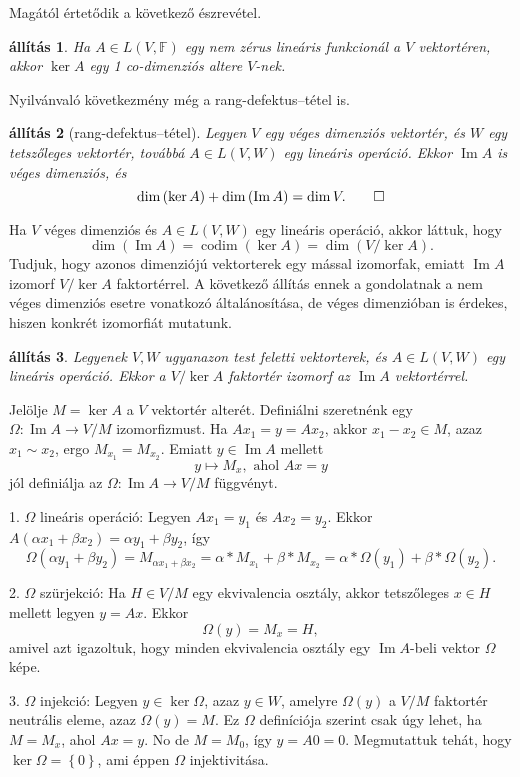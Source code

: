 \documentclass[9pt, a4paper, showtrims]{memoir}
\makeatletter
\renewenvironment{proof}[1][\proofname]
    {\par\pushQED{\qed}%
    \normalfont \topsep6\p@\@plus6\p@\relax
    \trivlist
    \item[\hskip\labelsep
        \itshape
    #1\@addpunct{:}]\ignorespaces}
    {\popQED\endtrivlist\@endpefalse}
\theoremstyle{plain}
\newtheorem{proposition}{állítás}[chapter]
\theoremstyle{remark}
\theoremstyle{definition}
\DeclareMathOperator{\codim}{codim}
\DeclareMathOperator{\im}{Im}
\makeatother
\begin{document}
Magától értetődik a következő észrevétel.
\begin{proposition}
Ha $A\in L\left( V,\mathbb{F} \right)$ egy nem zérus lineáris funkcionál a $V$ vektortéren,
akkor $\ker A$ egy 1 co-dimenziós altere $V$-nek.
\end{proposition}
Nyilvánvaló következmény még a rang-defektus--tétel is.
\begin{proposition}[rang-defektus--tétel]
    Legyen $V$ egy véges dimenziós vektortér,
    és $W$ egy tetszőleges vektortér, 
    továbbá $A\in L\left( V,W \right)$ egy lineáris operáció.
    Ekkor
    $\im A$ is véges dimenziós, és
    \[
        \dim\left( \ker A \right)+\dim\left( \im A \right)=\dim V.\qedhere
    \]
\end{proposition}

Ha $V$ véges dimenziós és $A\in L\left( V,W \right)$ egy lineáris operáció,
akkor láttuk, hogy
\[
\dim\left( \im A \right)
=
\codim\left( \ker A \right)
=
\dim\left( V/\ker A \right).
\]
Tudjuk, hogy azonos dimenziójú vektorterek egy mással izomorfak,
emiatt $\im A$ izomorf $V/\ker A$ faktortérrel.
A következő állítás ennek a gondolatnak a nem véges dimenziós esetre vonatkozó általánosítása,
de véges dimenzióban is érdekes, hiszen konkrét izomorfiát mutatunk.
\begin{proposition}
    Legyenek $V,W$ ugyanazon test feletti vektorterek,
    és $A\in L\left( V,W \right)$ egy lineáris operáció.
    Ekkor a
    \(
        V/\ker A
    \)
    faktortér izomorf az $\im A$ vektortérrel.
\end{proposition}
\begin{proof}
    Jelölje $M=\ker A$ a $V$ vektortér alterét.
    Definiálni szeretnénk egy $\Omega:\im A\to V/M$ izomorfizmust.
    Ha $Ax_1=y=Ax_2$, akkor $x_1-x_2\in M$, azaz $x_1\sim x_2$, ergo $M_{x_1}=M_{x_2}$.
    Emiatt $y\in\im A$ mellett
    \[
        y\mapsto M_x, \text{ ahol } Ax=y
    \]
    jól definiálja az $\Omega:\im A\to V/M$ függvényt.
    
    1. $\Omega$ lineáris operáció:
    Legyen $Ax_1=y_1$ és $Ax_2=y_2$.
    Ekkor 
    $A\left( \alpha x_1+\beta x_2 \right)=\alpha y_1+\beta y_2$, így
    \[
    \Omega\left( \alpha y_1+\beta y_2 \right)
    =
    M_{\alpha x_1+\beta x_2}
    =
    \alpha\ast M_{x_1}+\beta\ast M_{x_2}
    =
    \alpha\ast \Omega\left( y_1 \right)+\beta\ast\Omega\left( y_2 \right).
    \]

    2. $\Omega$ szürjekció:
    Ha $H\in V/M$ egy ekvivalencia osztály, 
    akkor tetszőleges $x\in H$ mellett legyen $y=Ax$.
    Ekkor
    \[
        \Omega\left( y \right)=M_x=H,
    \]
    amivel azt igazoltuk, 
    hogy minden ekvivalencia osztály egy $\im A$-beli vektor $\Omega$ képe.


    3. $\Omega$ injekció:
    Legyen $y\in\ker\Omega$, azaz $y\in W$, amelyre $\Omega\left( y \right)$ a $V/M$ faktortér neutrális eleme,
    azaz 
    $\Omega\left( y \right)=M$.
    Ez $\Omega$ definíciója szerint csak úgy lehet, ha $M=M_x$, ahol $Ax=y$.
    No de $M=M_0$, így $y=A0=0$.
    Megmutattuk tehát, hogy $\ker \Omega=\left\{ 0 \right\}$,
    ami éppen $\Omega$ injektivitása.
\end{proof}
\end{document}
